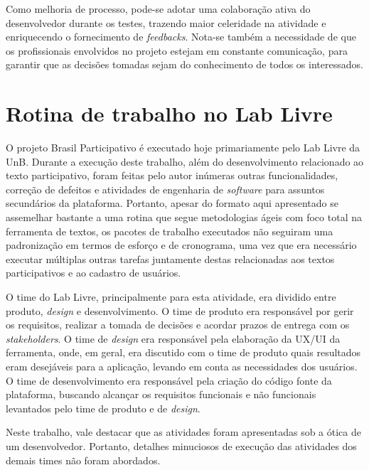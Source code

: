 Como melhoria de processo, pode-se adotar uma colaboração ativa do desenvolvedor durante os testes, trazendo maior celeridade na atividade e enriquecendo o fornecimento de \textit{feedbacks}.
Nota-se também a necessidade de que os profissionais envolvidos no projeto estejam em constante comunicação, para garantir que as decisões tomadas sejam do conhecimento de todos os interessados.

\section {Rotina de trabalho no Lab Livre}
\label{sec:rotina-de-trabalho-no-lab-livre}

O projeto Brasil Participativo é executado hoje primariamente pelo Lab Livre da UnB.
Durante a execução deste trabalho, além do desenvolvimento relacionado ao texto participativo, foram feitas pelo autor inúmeras outras funcionalidades, correção de defeitos e atividades de engenharia de \textit{software} para assuntos secundários da plataforma.
Portanto, apesar do formato aqui apresentado se assemelhar bastante a uma rotina que segue metodologias ágeis com foco total na ferramenta de textos, os pacotes de trabalho executados não seguiram uma padronização em termos de esforço e de cronograma, uma vez que era necessário executar múltiplas outras tarefas juntamente destas relacionadas aos textos participativos e ao cadastro de usuários.

O time do Lab Livre, principalmente para esta atividade, era dividido entre produto, \textit{design} e desenvolvimento.
O time de produto era responsável por gerir os requisitos, realizar a tomada de decisões e acordar prazos de entrega com os \textit{stakeholders}.
O time de \textit{design} era responsável pela elaboração da UX/UI da ferramenta, onde, em geral, era discutido com o time de produto quais resultados eram desejáveis para a aplicação, levando em conta as necessidades dos usuários.
O time de desenvolvimento era responsável pela criação do código fonte da plataforma, buscando alcançar os requisitos funcionais e não funcionais levantados pelo time de produto e de \textit{design}.

Neste trabalho, vale destacar que as atividades foram apresentadas sob a ótica de um desenvolvedor.
Portanto, detalhes minuciosos de execução das atividades dos demais times não foram abordados.
